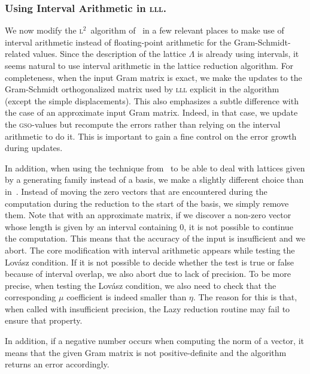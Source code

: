 \documentclass{amsart}
\newcommand{\GSO}{\mbox{\textsc{gso}\xspace}}
\newcommand{\LL}{\mbox{\textsc{l}$^2$}\xspace}
\newcommand{\LLL}{\mbox{\textsc{lll}}}
\newcommand{\Lat}{\Lambda}
\theoremstyle{definition}
\begin{document}
\subsubsection{Using Interval Arithmetic in \LLL.}
We now modify the \LL~algorithm of~\cite{NguyenS09} in a few relevant
places to make use of interval arithmetic instead of floating-point
arithmetic for the Gram-Schmidt-related values.  Since the description
of the lattice $\Lat$ is already using intervals, it seems natural to
use interval arithmetic in the lattice reduction algorithm. For
completeness, when the input Gram matrix is exact, we make the updates
to the Gram-Schmidt orthogonalized matrix used by \LLL{} explicit in
the algorithm (except the simple displacements).  This also emphasizes
a subtle difference with the case of an approximate input Gram
matrix. Indeed, in that case, we update the \GSO-values but recompute
the errors rather than relying on the interval arithmetic to do
it. This is important to gain a fine control on the error growth
during updates.

In addition, when using the technique from~\cite{Pohst87} to be able
to deal with lattices given by a generating family instead of a basis,
we make a slightly different choice than in~\cite{NguyenS09}. Instead
of moving the zero vectors that are encountered during the computation
during the reduction to the start of the basis, we simply remove them.
Note that with an approximate matrix, if we discover a non-zero vector
whose length is given by an interval containing $0$, it is not
possible to continue the computation. This means that the accuracy of
the input is insufficient and we abort. The core modification with
interval arithmetic appears while testing the Lovász condition. If it
is not possible to decide whether the test is true or false because
of interval overlap, we also abort due to lack of precision. To be
more precise, when testing the Lovász condition, we also need to check
that the corresponding $\mu$ coefficient is indeed smaller than
$\eta$. The reason for this is that, when called with insufficient
precision, the Lazy reduction routine may fail to ensure that
property.

In addition, if a negative number occurs when computing the norm of a
vector, it means that the given Gram matrix is not positive-definite
and the algorithm returns an error accordingly.
\end{document}
